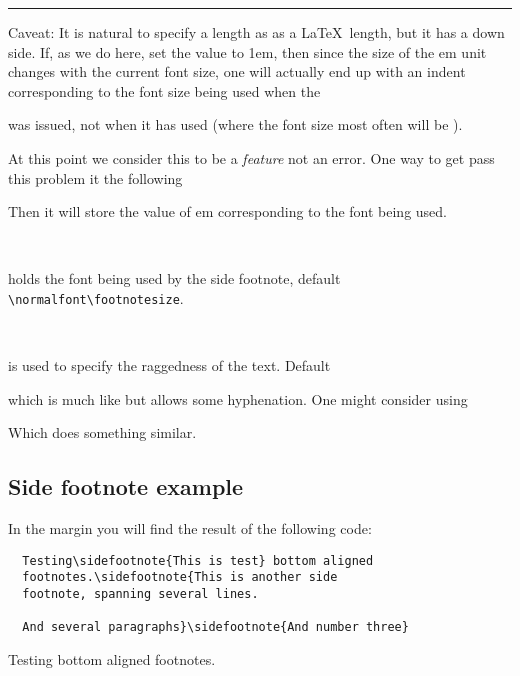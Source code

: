 \documentclass[10pt,a4paper,extrafontsizes]{memoir}
\newcommand{\LMnote}[2]{}
\begin{document}
\fancybreak{}

Caveat: It is natural to specify a length as \lnc{\sidefootparindent}
as a \LaTeX\ length, but it has a down side. If, as we do here, set
the value to 1em, then since the size of the em unit changes with the
current font size, one will actually end up with an indent
corresponding to the font size being used when the
\begin{lcode}
  \setlength{\sidefootparindent}{1em}
\end{lcode}
was issued, not when it has used (where the font size most often will
be \cmd{\footnotesize}).

At this point we consider this to be a \emph{feature} not an
error. One way to get pass this problem it the following
\begin{lcode}
\begingroup%
\sidefoottextfont
\global\setlength\sidefootparindent{1em}
\endgroup  
\end{lcode}
Then it will store the value of em corresponding to the font being
used. 


\LMnote{2010/02/07}{explained the rest, left the side footnote hook
  out of it for now}
\begin{syntax}
  \cmd{\sidefoottextfont}\\
\end{syntax}
holds the font being used by the side footnote, default
\verb+\normalfont\footnotesize+. 
\begin{syntax}
  \cmd{\sidefootform}\\
\end{syntax}
is used to specify the raggedness of the text. Default
\begin{lcode}
  \newcommand*{\sidefootform}{\rightskip=\z@ \@plus 2em}
\end{lcode}
which is much like  but allows some hyphenation. One
might consider using
\begin{lcode}
  \usepackage{ragged2e}
  \newcommand*{\sidefootform}{\RaggedRight}
\end{lcode}
Which does something similar.





\subsection{Side footnote example}
\label{sec:side-footn-example}



In the margin you will find the result of the following code:
\begin{verbatim}
  Testing\sidefootnote{This is test} bottom aligned
  footnotes.\sidefootnote{This is another side 
  footnote, spanning several lines.

  And several paragraphs}\sidefootnote{And number three}
\end{verbatim}
  Testing bottom aligned
  footnotes.
\end{document}
